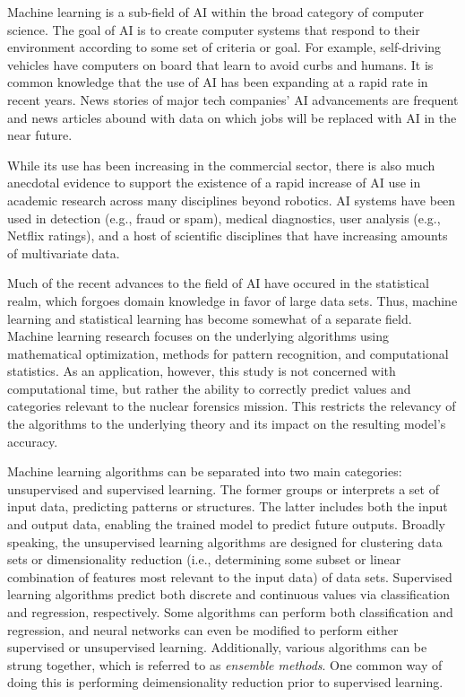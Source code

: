 Machine learning is a sub-field of \gls{AI} within the broad category of
computer science. The goal of \gls{AI} is to create computer systems that
respond to their environment according to some set of criteria or goal. For
example, self-driving vehicles have computers on board that learn to avoid
curbs and humans. It is common knowledge that the use of \gls{AI} has been
expanding at a rapid rate in recent years. News stories of major tech
companies' \gls{AI} advancements are frequent and news articles abound with
data on which jobs will be replaced with \gls{AI} in the near future. 

While its use has been increasing in the commercial sector, there is also much
anecdotal evidence to support the existence of a rapid increase of \gls{AI} use
in academic research across many disciplines beyond robotics. \gls{AI} systems
have been used in detection (e.g., fraud or spam), medical diagnostics, user
analysis (e.g., Netflix ratings), and a host of scientific disciplines that
have increasing amounts of multivariate data.

Much of the recent advances to the field of \gls{AI} have occured in the
statistical realm, which forgoes domain knowledge in favor of large data sets.
Thus, machine learning and statistical learning has become somewhat of a
separate field.  Machine
learning research focuses on the underlying algorithms using mathematical
optimization, methods for pattern recognition, and computational statistics.
As an application, however, this study is not concerned with computational
time, but rather the ability to correctly predict values and categories
relevant to the nuclear forensics mission. This restricts the relevancy of the
algorithms to the underlying theory and its impact on the resulting model's
accuracy. 

Machine learning algorithms can be separated into two main categories:
unsupervised and supervised learning.  The former groups or interprets a set of
input data, predicting patterns or structures. The latter includes both the
input and output data, enabling the trained model to predict future outputs.
Broadly speaking, the unsupervised learning algorithms are designed for
clustering data sets or dimensionality reduction (i.e., determining some subset
or linear combination of features most relevant to the input data) of data
sets.  Supervised learning algorithms predict both discrete and continuous
values via classification and regression, respectively. Some algorithms can
perform both classification and regression, and neural networks can even be
modified to perform either supervised or unsupervised learning. Additionally,
various algorithms can be strung together, which is referred to as
\textit{ensemble methods}. One common way of doing this is performing
deimensionality reduction prior to supervised learning. 

